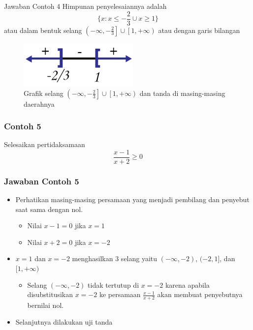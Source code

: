 \documentclass[pdflatex,compress,mathserif]{beamer}
\begin{document}
		\begin{frame}{Jawaban Contoh 4}
			Himpunan penyelesaiannya adalah
			$$ \{x: x \leq -\frac{2}{3} \cup x \geq 1\} $$
			atau dalam bentuk selang $ \left(-\infty,-\frac{2}{3} \right] \cup \left[ 1,+\infty \right) $ atau dengan garis bilangan
			\begin{figure}
				\centering
				\includegraphics[width=0.3\linewidth]{pict/16}
				\caption{Grafik selang $ \left(-\infty,-\frac{2}{3} \right] \cup \left[ 1,+\infty \right) $ dan tanda di masing-masing daerahnya}
				\label{fig:16}
			\end{figure}
		\end{frame}
	
		\begin{frame}
			\frametitle{Contoh 5}
			Selesaikan pertidaksamaan
			\begin{equation*}
				\frac{x - 1}{x + 2} \geq 0
			\end{equation*}
		\end{frame}
		
		\begin{frame}
			\frametitle{Jawaban Contoh 5}
			\begin{itemize}
				\item Perhatikan masing-masing persamaan yang menjadi pembilang dan penyebut saat sama dengan nol.
				\begin{itemize}
					\item Nilai $ x - 1 = 0 $ jika $ x = 1 $
					\item Nilai $ x + 2 = 0 $ jika $ x = -2 $
				\end{itemize}
				\item $ x = 1 $ dan $ x = -2 $ menghasilkan 3 selang yaitu $ (-\infty,-2) $, $ (-2,1] $, dan $ [1,+\infty) $
				\begin{itemize}
					\item Selang $ (-\infty,-2) $ tidak tertutup di $ x = -2 $ karena apabila disubstitusikan $ x = -2 $ ke persamaan $\frac{x-1}{x+2}$ akan membuat penyebutnya bernilai nol.
				\end{itemize}
				\item Selanjutnya dilakukan uji tanda
			\end{itemize}
		\end{frame}
	
\end{document}
